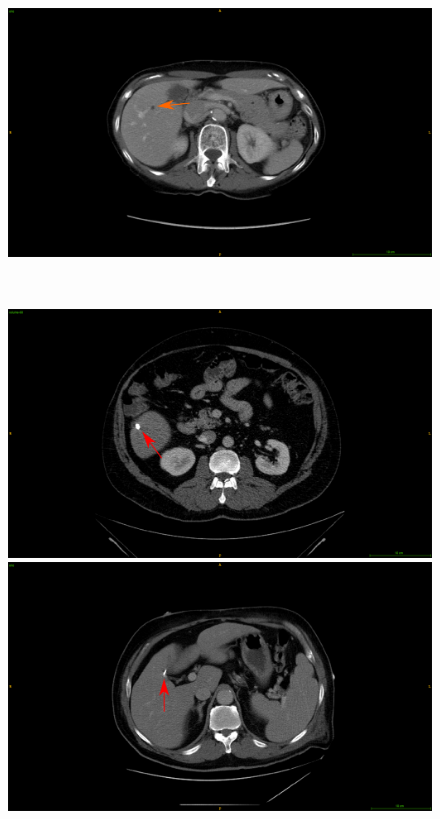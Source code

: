 \begin{figure}[!ht]
\begin{minipage}{0.45\linewidth}
	\end{minipage} \hspace{-0.1cm}
	\begin{minipage}{0.45\linewidth}
		\includegraphics[width=\linewidth]{../Contributions/images/Artifacts/ResizeTCIA_fat}
	\end{minipage} \\
	\begin{minipage}{0.45\linewidth}
		\includegraphics[width=\linewidth]{../Contributions/images/Artifacts/ResizeLITS_metallic_artifacts}
	\end{minipage} \hspace{-0.1cm}
	\begin{minipage}{0.45\linewidth}
		\includegraphics[width=\linewidth]{../Contributions/images/Artifacts/ResizeTCIA_metallic_artifacts}

\end{minipage}
\end{figure}
